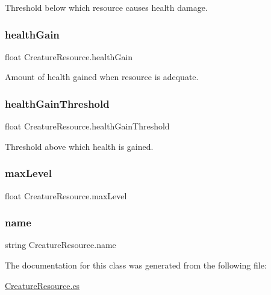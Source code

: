 Threshold below which resource causes health damage. 

\mbox{\label{class_creature_resource_a6aaa2e2cde79ab61cbf3683eccc2abff}} 
\subsubsection{\texorpdfstring{health\+Gain}{healthGain}}
{\footnotesize\ttfamily float Creature\+Resource.\+health\+Gain}



Amount of health gained when resource is adequate. 

\mbox{\label{class_creature_resource_a2c4cc459420f7200685c9f0978a63116}} 
\subsubsection{\texorpdfstring{health\+Gain\+Threshold}{healthGainThreshold}}
{\footnotesize\ttfamily float Creature\+Resource.\+health\+Gain\+Threshold}



Threshold above which health is gained. 

\mbox{\label{class_creature_resource_ac971dcddb000d950d2bfe414e4a5ca7b}} 
\subsubsection{\texorpdfstring{max\+Level}{maxLevel}}
{\footnotesize\ttfamily float Creature\+Resource.\+max\+Level}

\mbox{\label{class_creature_resource_a4653faf953fa8384caf57e2b47893d3a}} 
\subsubsection{\texorpdfstring{name}{name}}
{\footnotesize\ttfamily string Creature\+Resource.\+name}



The documentation for this class was generated from the following file\+:\begin{DoxyCompactItemize}
\item 
\mbox{\hyperlink{_creature_resource_8cs}{Creature\+Resource.\+cs}}\end{DoxyCompactItemize}

